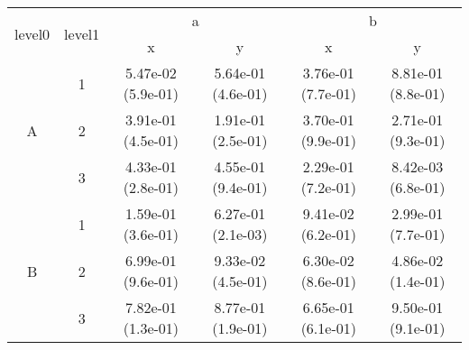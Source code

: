\begin{tabular}{cccccc}
\toprule
\multirow{2}{*}{level0} & \multirow{2}{*}{level1}&\multicolumn{2}{c}{a}&\multicolumn{2}{c}{b}\tabularnewline
\cmidrule(lr){3-4}
\cmidrule(lr){5-6}
&&x&y&x&y\tabularnewline
\midrule
\multirow{3}{*}{A}&1& 5.47e-02 (5.9e-01)& 5.64e-01 (4.6e-01)& 3.76e-01 (7.7e-01)& 8.81e-01 (8.8e-01)\tabularnewline
&2& 3.91e-01 (4.5e-01)& 1.91e-01 (2.5e-01)& 3.70e-01 (9.9e-01)& 2.71e-01 (9.3e-01)\tabularnewline
&3& 4.33e-01 (2.8e-01)& 4.55e-01 (9.4e-01)& 2.29e-01 (7.2e-01)& 8.42e-03 (6.8e-01)\tabularnewline
\midrule
\multirow{3}{*}{B}&1& 1.59e-01 (3.6e-01)& 6.27e-01 (2.1e-03)& 9.41e-02 (6.2e-01)& 2.99e-01 (7.7e-01)\tabularnewline
&2& 6.99e-01 (9.6e-01)& 9.33e-02 (4.5e-01)& 6.30e-02 (8.6e-01)& 4.86e-02 (1.4e-01)\tabularnewline
&3& 7.82e-01 (1.3e-01)& 8.77e-01 (1.9e-01)& 6.65e-01 (6.1e-01)& 9.50e-01 (9.1e-01)\tabularnewline
\bottomrule
\end{tabular}
